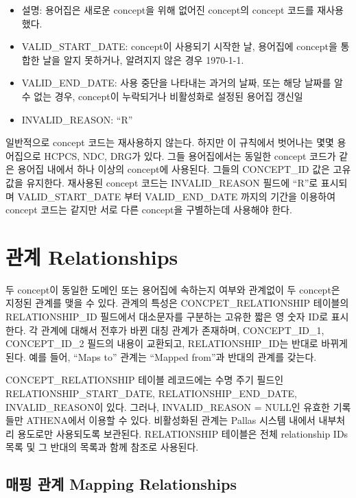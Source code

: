 \documentclass[11pt]{book}
\providecommand{\tightlist}{%
  \setlength{\itemsep}{0pt}\setlength{\parskip}{0pt}}
\theoremstyle{definition}
\theoremstyle{definition}
\theoremstyle{definition}
\theoremstyle{remark}
\begin{document}
\begin{itemize}
  \begin{itemize}
  \tightlist
  \item
    설명: 용어집은 새로운 concept을 위해 없어진 concept의 concept 코드를
    재사용했다.
  \item
    VALID\_START\_DATE: concept이 사용되기 시작한 날, 용어집에 concept을
    통합한 날을 알지 못하거나, 알려지지 않은 경우 1970-1-1.\\
  \item
    VALID\_END\_DATE: 사용 중단을 나타내는 과거의 날짜, 또는 해당 날짜를
    알 수 없는 경우, concept이 누락되거나 비활성화로 설정된 용어집
    갱신일
  \item
    INVALID\_REASON: ``R''
  \end{itemize}
\end{itemize}

일반적으로 concept 코드는 재사용하지 않는다. 하지만 이 규칙에서 벗어나는
몇몇 용어집으로 HCPCS, NDC, DRG가 있다. 그들 용어집에서는 동일한 concept
코드가 같은 용어집 내에서 하나 이상의 concept에 사용된다. 그들의
CONCEPT\_ID 값은 고유값을 유지한다. 재사용된 concept 코드는
INVALID\_REASON 필드에 ``R''로 표시되며 VALID\_START\_DATE 부터
VALID\_END\_DATE 까지의 기간을 이용하여 concept 코드는 같지만 서로 다른
concept을 구별하는데 사용해야 한다.

\section{관계 Relationships}\label{-relationships}

두 concept이 동일한 도메인 또는 용어집에 속하는지 여부와 관계없이 두
concept은 지정된 관계를 맺을 수 있다. 관계의 특성은
CONCPET\_RELATIONSHIP 테이블의 RELATIONSHIP\_ID 필드에서 대소문자를
구분하는 고유한 짧은 영 숫자 ID로 표시한다. 각 관계에 대해서 전후가 바뀐
대칭 관계가 존재하며, CONCEPT\_ID\_1, CONCEPT\_ID\_2 필드의 내용이
교환되고, RELATIONSHIP\_ID는 반대로 바뀌게 된다. 예를 들어, ``Maps to''
관계는 ``Mapped from''과 반대의 관계를 갖는다.

CONCEPT\_RELATIONSHIP 테이블 레코드에는 수명 주기 필드인
RELATIONSHIP\_START\_DATE, RELATIONSHIP\_END\_DATE, INVALID\_REASON이
있다. 그러나, INVALID\_REASON = NULL인 유효한 기록들만 ATHENA에서 이용할
수 있다. 비활성화된 관계는 Pallas 시스템 내에서 내부처리 용도로만
사용되도록 보관된다. RELATIONSHIP 테이블은 전체 relationship IDs 목록 및
그 반대의 목록과 함께 참조로 사용된다.

\subsection{매핑 관계 Mapping Relationships}\label{conceptMapping}
\end{document}
